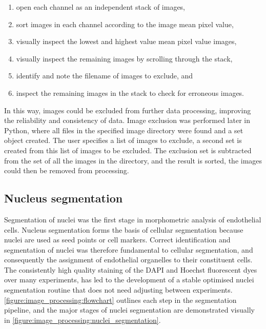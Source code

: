 \begin{enumerate}\setlength\itemsep{0pt}
	\item open each channel as an independent stack of images,
	\item sort images in each channel according to the image mean pixel value,
	\item visually inspect the lowest and highest value mean pixel value images,
	\item visually inspect the remaining images by scrolling through the stack,
	\item identify and note the filename of images to exclude, and
	\item inspect the remaining images in the stack to check for erroneous images.
\end{enumerate}
In this way, images could be excluded from further data processing, improving the reliability and consistency of data. Image exclusion was performed later in Python, where all files in the specified image directory were found and a set object created. The user specifies a list of images to exclude, a second set is created from this list of images to be excluded. The exclusion set is subtracted from the set of all the images in the directory, and the result is sorted, the images could then be removed from processing.

\subsection{Nucleus segmentation}
\label{endothelial_morphometry:image_processing:nuclei}
Segmentation of nuclei was the first stage in morphometric analysis of endothelial cells. Nucleus segmentation forms the basis of cellular segmentation because nuclei are used as seed points or cell markers. Correct identification and segmentation of nuclei was therefore fundamental to cellular segmentation, and consequently the assignment of endothelial organelles to their constituent cells. The consistently high quality staining of the DAPI and Hoechst fluorescent dyes over many experiments, has led to the development of a stable optimised nuclei segmentation routine that does not need adjusting between experiments. \autoref{figure:image_processing:flowchart} outlines each step in the segmentation pipeline, and the major stages of nuclei segmentation are demonstrated visually in \autoref{figure:image_processing:nuclei_segmentation}.


